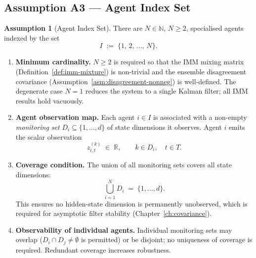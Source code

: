 \documentclass[12pt,openany]{book}
\numberwithin{equation}{chapter}
\theoremstyle{plain}
\theoremstyle{definition}
\newtheorem{assumption}[theorem]{Assumption}
\theoremstyle{remark}
\def\mathcal#1{#1}%
\begin{document}
\subsection*{Assumption A3 — Agent Index Set}

\begin{assumption}[Agent Index Set]
\label{asm:agents}
There are $N \in \mathbb{N}$, $N \geq 2$, specialised agents
indexed by the set
\begin{equation}
  \mathcal{I} \;:=\; \{1,\,2,\,\ldots,\,N\}.
  \label{eq:agent-index}
\end{equation}

\begin{enumerate}[label=\textbf{A3.\arabic*.}, leftmargin=*, widest=A3.5.]
  \item \textbf{Minimum cardinality.}
        $N \geq 2$ is required so that the IMM mixing matrix
        (Definition~\ref{def:imm-mixture}) is non-trivial and the
        ensemble disagreement covariance
        (Assumption~\ref{asm:disagreement-nonneg}) is well-defined.
        The degenerate case $N = 1$ reduces the system to a
        single Kalman filter; all IMM results hold vacuously.

  \item \textbf{Agent observation map.}
        Each agent $i \in \mathcal{I}$ is associated with a
        non-empty \emph{monitoring set}
        $\mathcal{D}_i \subseteq \{1,\ldots,d\}$ of state
        dimensions it observes.  Agent $i$ emits the scalar
        observation
        \begin{equation}
          z_{i,t}^{(k)} \;\in\; \mathbb{R},
          \qquad k \in \mathcal{D}_i,\quad t \in \mathcal{T}.
          \label{eq:agent-obs}
        \end{equation}

  \item \textbf{Coverage condition.}
        The union of all monitoring sets covers all state
        dimensions:
        \begin{equation}
          \bigcup_{i=1}^{N} \mathcal{D}_i
          \;=\; \{1,\ldots,d\}.
          \label{eq:coverage}
        \end{equation}
        This ensures no hidden-state dimension is permanently
        unobserved, which is required for asymptotic filter
        stability (Chapter~\ref{ch:covariance}).

  \item \textbf{Observability of individual agents.}
        Individual monitoring sets may overlap
        ($\mathcal{D}_i \cap \mathcal{D}_j \neq \emptyset$ is
        permitted) or be disjoint; no uniqueness of coverage is
        required.  Redundant coverage increases robustness.


\end{enumerate}
\end{assumption}
\end{document}
